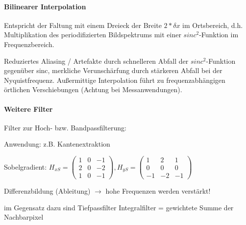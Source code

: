 \documentclass[landscape]{article}
\begin{document}
\begin{multicols}{3}
  \paragraph{Bilinearer Interpolation}
  \begin{itemize*}
    \item Entspricht der Faltung mit einem Dreieck der Breite $2*\delta x$ im Ortsbereich, d.h. Multiplikation des periodifizierten Bildspektrums mit einer $sinc^2$-Funktion im Frequenzbereich.
    \item Reduziertes Aliasing / Artefakte durch schnelleren Abfall der $sinc^2$-Funktion gegenüber sinc, merkliche Verunschärfung durch stärkeren Abfall bei der Nyquistfrequenz. Außermittige Interpolation führt zu frequenzabhängigen örtlichen Verschiebungen (Achtung bei Messanwendungen).
  \end{itemize*}
  
  \paragraph{Weitere Filter}
  \begin{itemize*}
    \item Filter zur Hoch- bzw. Bandpassfilterung:
    \item Anwendung: z.B. Kantenextraktion
    \item Sobelgradient: $H_{xS} =\begin{pmatrix} 1&0&-1\\ 2&0&-2\\ 1&0&-1\end{pmatrix}, H_{yS}=\begin{pmatrix} 1&2&1\\ 0&0&0\\ -1&-2&-1 \end{pmatrix}$
    \item Differenzbildung (Ableitung) $\rightarrow$ hohe Frequenzen werden verstärkt!
    \item im Gegensatz dazu sind Tiefpassfilter Integralfilter = gewichtete Summe der Nachbarpixel
  \end{itemize*}
  
  
\end{multicols}
\end{document}
